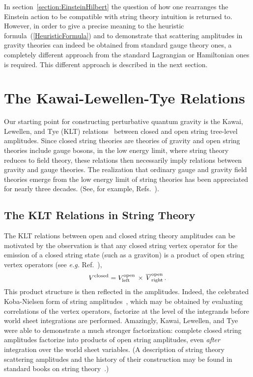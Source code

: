 \documentclass[12pt]{livrev}
\begin{document}
In section~\ref{section:EinsteinHilbert} the question of how one
rearranges the Einstein action to be compatible with string theory
intuition is returned to.  However, in order to give a precise meaning
to the heuristic formula~(\ref{HeuristicFormula}) and to demonstrate
that scattering amplitudes in gravity theories can indeed be
obtained from standard gauge theory ones, a completely different
approach from the standard Lagrangian or Hamiltonian ones is required.
This different approach is described in the next section.

\newpage

\section{The Kawai-Lewellen-Tye Relations}
\label{section:KLT_Relations}

Our starting point for constructing perturbative quantum gravity is
the Kawai, Lewellen, and Tye (KLT) relations~\cite{KLT} between closed
and open string tree-level amplitudes.  Since closed string theories are
theories of gravity and open string theories include gauge bosons, in
the low energy limit, where string theory reduces to field theory,
these relations then necessarily imply relations between gravity and
gauge theories. The realization that ordinary gauge and gravity
field theories emerge from the low energy limit of string theories 
has been appreciated for nearly three decades. (See, for example,
Refs.~\cite{Yoneya74,Scherk,Sannan86,GSB,GSW,Polchinski98A,Polchinski98B}).


\subsection{The KLT Relations in String Theory}

The KLT relations between open and closed string theory amplitudes
can be motivated by the observation is that any
closed string vertex operator for the emission of a closed string
state (such as a graviton) is a product of open string vertex
operators (see {\it e.g.} Ref.~\cite{GSW}),
%
\begin{equation}
V^{\rm closed} = V_{\rm left}^{\rm open}\, \times \,  
\overline{V}_{\rm right}^{\rm  open} \,.
\label{ClosedVertex}
\end{equation}
%
This product structure is then reflected in the amplitudes.  Indeed,
the celebrated Koba-Nielsen form of string
amplitudes~\cite{KobaNielsen}, which may be obtained by evaluating
correlations of the vertex operators, factorize at the level of the
integrands before world sheet integrations are performed.  Amazingly,
Kawai, Lewellen, and Tye were able to demonstrate a much stronger
factorization: complete closed string amplitudes factorize into
products of open string amplitudes, even {\it after} integration over
the world sheet variables.  (A description of string theory scattering
amplitudes and the history of their construction may be found in
standard books on string theory~\cite{GSW,Polchinski98A,Polchinski98B}.)
\end{document}
